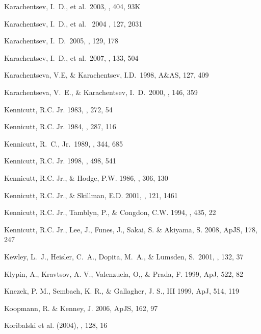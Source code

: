\documentclass[preprint]{aastex}
\begin{document}
\begin{thebibliography}{}
Karachentsev, I.~D., et al.\ 2003, \aap, 404, 93K 

Karachentsev, I.~D., et al. \ 2004 \aj, 127, 2031

Karachentsev, I.~D.\ 2005, \aj, 129, 178 

Karachentsev, I.~D., et al.\ 2007, \aj, 133, 504 

Karachentseva, V.E, \& Karachentsev, I.D.\ 1998, A\&AS, 127, 409 

Karachentseva, V.~E., \& Karachentsev, I.~D.\ 2000, \aaps, 146, 359 

Kennicutt, R.C. Jr. 1983, \apj , 272, 54

Kennicutt, R.C. Jr. 1984, \apj , 287, 116

Kennicutt, R.~C., Jr.\ 1989, \apj, 344, 685 

Kennicutt, R.C. Jr. 1998, \apj , 498, 541

Kennicutt, R.C. Jr., \& Hodge, P.W. 1986, \apj , 306, 130

Kennicutt, R.C. Jr., \& Skillman, E.D. 2001, \aj , 121, 1461 

Kennicutt, R.C. Jr., Tamblyn, P., \& Congdon, C.W. 1994, \apj , 435, 22

Kennicutt, R.C. Jr., Lee, J., Funes, J., Sakai, S. \& Akiyama, S. 2008, ApJS, 178, 247

Kewley, L.~J., Heisler, C.~A., Dopita, M.~A., \& Lumsden, S.\ 2001, \apjs, 132, 37 

Klypin, A., Kravtsov, A. V., Valenzuela, O,, \& Prada, F. 1999, ApJ, 522, 82

Knezek, P. M., Sembach, K. R., \& Gallagher, J. S., III 1999, ApJ, 514, 119

Koopmann, R. \& Kenney, J. 2006, ApJS, 162, 97

Koribalski et al. (2004),  \aj, 128, 16


\end{thebibliography}
\end{document}
